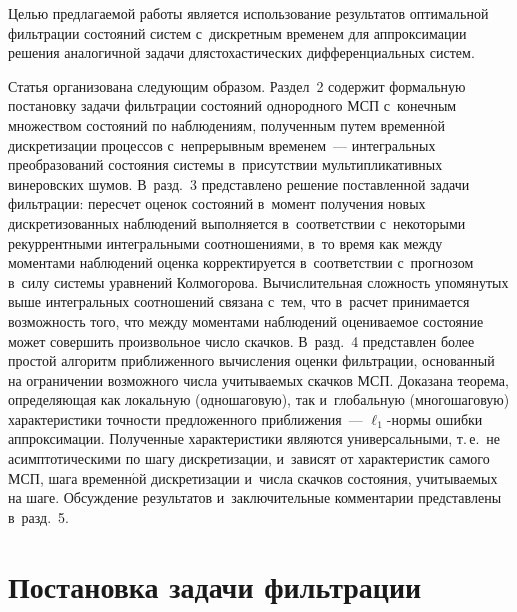 \begin{multicols}{2}
 Целью предлагаемой работы является ис\-поль\-зование результатов оптимальной 
 фильтрации со\-стояний сис\-тем с~дискретным временем для аппроксимации решения 
 аналогичной задачи для\linebreak стохастических дифференциальных сис\-тем. 
 
 Статья организована следующим образом. Раздел~2 содержит формальную постановку 
 задачи фильт\-ра\-ции со\-сто\-яний однородного МСП с~конечным множеством со\-сто\-яний 
 по наблюдениям, полученным путем временн$\acute{\mbox{о}}$й дискретизации процессов с~непрерывным 
 временем~--- интегральных преобразований со\-сто\-яния сис\-те\-мы в~присутствии 
 мультипликативных винеровских шумов.\linebreak
  В~разд.~3 пред\-став\-ле\-но решение поставленной 
 задачи фильт\-ра\-ции: пересчет оценок со\-сто\-яний в~момент получения новых 
 дискретизованных наблюдений выполняется в~соответствии с~некоторыми\linebreak 
 рекуррентными интегральными соотношениями, в~то время как между 
 моментами наблюдений оценка корректируется в~соответствии с~прогнозом в~силу 
 сис\-те\-мы уравнений Колмогорова. Вы\-чис\-ли\-тель\-ная слож\-ность 
 упомянутых выше интегральных\linebreak 
 соотношений связана с~тем, что в~расчет принимается воз\-мож\-ность того, что между 
 моментами наблюдений оцениваемое со\-сто\-яние может совершить произвольное чис\-ло 
 скачков. В~разд.~4 пред\-став\-лен более простой алгоритм приближенного вы\-чис\-ле\-ния 
 оценки фильт\-ра\-ции, основанный на ограничении возможного числа учитываемых скачков 
 МСП. Доказана тео\-ре\-ма, опре\-де\-ля\-ющая как\linebreak
  локальную (одношаговую), так и~глобальную 
 (многошаговую) характеристики точ\-ности предложенного при\-бли\-же\-ния~--- 
 $\ell_1$-нор\-мы ошибки аппроксимации. Полученные характеристики являются\linebreak 
 универсальными, т.\,е.\ не асимптотическими по шагу дискретизации, и~зависят от характеристик 
 самого МСП, %
  шага временн$\acute{\mbox{о}}$й дискретизации и~чис\-ла
  скачков со\-сто\-яния, учи\-ты\-ва\-емых 
 на шаге. Об\-суж\-де\-ние результатов и~заключительные комментарии пред\-став\-ле\-ны 
 в~разд.~5.
 
 \section{Постановка задачи фильтрации}
 

\end{multicols}
